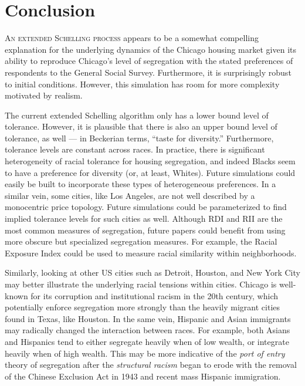 \chapter{Conclusion}
\label{conclusion}

{\lettrine[lines=3,slope=1pt,nindent=1pt,]{\textcolor{SchoolColor}{A}}{n extended Schelling process} appears to be a somewhat compelling explanation for the underlying dynamics of the Chicago housing market given its ability to reproduce Chicago's level of segregation with the stated preferences of respondents to the General Social Survey. Furthermore, it is surprisingly robust to initial conditions. However, this simulation has room for more complexity motivated by realism.

The current extended Schelling algorithm only has a lower bound level of tolerance. However, it is plausible that there is also an upper bound level of tolerance, as well --- in Beckerian terms, ``taste for diversity.'' Furthermore, tolerance levels are constant across races. In practice, there is significant heterogeneity of racial tolerance for housing segregation, and indeed Blacks seem to have a preference for diversity (or, at least, Whites). Future simulations could easily be built to incorporate these types of heterogeneous preferences. In a similar vein, some cities, like Los Angeles, are not well described by a monocentric price topology. Future simulations could be parameterized to find implied tolerance levels for such cities as well. Although RDI and RII are the most common measures of segregation, future papers could benefit from using more obscure but specialized segregation measures. For example, the Racial Exposure Index could be used to measure racial similarity within neighborhoods.

Similarly, looking at other US cities such as Detroit, Houston, and New York City may better illustrate the underlying racial tensions within cities. Chicago is well-known for its corruption and institutional racism in the 20th century, which potentially enforce segregation more strongly than the heavily migrant cities found in Texas, like Houston. In the same vein, Hispanic and Asian immigrants may radically changed the interaction between races. For example, both Asians and Hispanics tend to either segregate heavily when of low wealth, or integrate heavily when of high wealth. This may be more indicative of the \textit{port of entry} theory of segregation after the \textit{structural racism} began to erode with the removal of the Chinese Exclusion Act in 1943 and recent mass Hispanic immigration.

}
